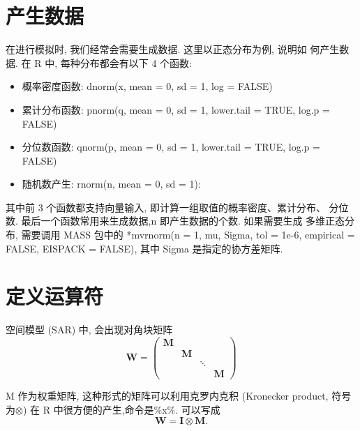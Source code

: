 \documentclass[]{ctexbook}
\newenvironment{Shaded}{\begin{snugshade}}{\end{snugshade}}
\newcommand{\DecValTok}[1]{\textcolor[rgb]{0.00,0.00,0.81}{#1}}
\newcommand{\KeywordTok}[1]{\textcolor[rgb]{0.13,0.29,0.53}{\textbf{#1}}}
\newcommand{\NormalTok}[1]{#1}
\newcommand{\OperatorTok}[1]{\textcolor[rgb]{0.81,0.36,0.00}{\textbf{#1}}}
\providecommand{\tightlist}{%
  \setlength{\itemsep}{0pt}\setlength{\parskip}{0pt}}
\begin{document}
\hypertarget{section-3}{%
\section{产生数据}\label{section-3}}

在进行模拟时, 我们经常会需要生成数据. 这里以正态分布为例, 说明如 何产生数据. 在 R 中, 每种分布都会有以下 4 个函数:

\begin{itemize}
\tightlist
\item
  概率密度函数: dnorm(x, mean = 0, sd = 1, log = FALSE)
\item
  累计分布函数: pnorm(q, mean = 0, sd = 1, lower.tail = TRUE, log.p = FALSE)
\item
  分位数函数: qnorm(p, mean = 0, sd = 1, lower.tail = TRUE, log.p = FALSE)
\item
  随机数产生: rnorm(n, mean = 0, sd = 1):
\end{itemize}

其中前 3 个函数都支持向量输入, 即计算一组取值的概率密度、累计分布、 分位数. 最后一个函数常用来生成数据,n 即产生数据的个数. 如果需要生成 多维正态分布, 需要调用 MASS 包中的
*mvrnorm(n = 1, mu, Sigma, tol = 1e-6, empirical = FALSE, EISPACK = FALSE),
其中 Sigma 是指定的协方差矩阵.

\hypertarget{section-4}{%
\section{定义运算符}\label{section-4}}

空间模型 (SAR) 中, 会出现对角块矩阵 \[ \mathbf{W}=\left(\begin{array}{cccc}{\mathbf{M}} & {} & {} & {} \\ {} & {\mathbf{M}} & {} & {} \\ {} & {} & {\ddots} & {} \\ {} & {} & {} & {\mathbf{M}}\end{array}\right) \]

M 作为权重矩阵, 这种形式的矩阵可以利用克罗内克积 (Kronecker product, 符号为\(\otimes\)) 在 R 中很方便的产生,命令是\%x\%.
可以写成\[\mathbf{W} = \mathbf{I} \otimes \mathbf{M}.\]

\begin{Shaded}
\end{Shaded}
\end{document}
